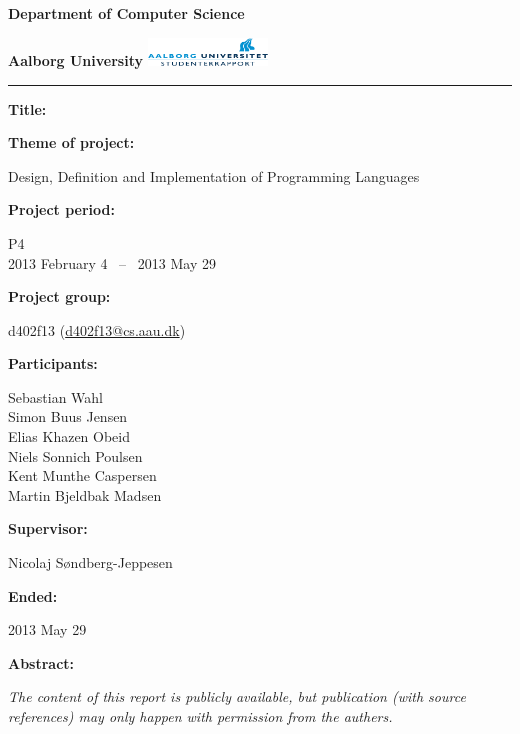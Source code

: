 \begin{nopagebreak}
\LARGE{\textbf{Department of Computer Science}}\vspace{-0.6cm}

\large{\textbf{Aalborg University}}
\hspace{5.70cm}\includegraphics[height=0.75cm]{pictures/aau_logo.pdf}


\hrule

\newcommand{\titleitem}[2]{\textbf{#1:}

\hspace*{0.5cm}
\begin{minipage}{0.9\columnwidth}#2\end{minipage}
\vspace{0.25cm}}
\begin{multicols}{2}

\titleitem{Title}{}

\titleitem{Theme of project}{Design, Definition and Implementation of Programming Languages}

\titleitem{Project period}{P4\\2013 February 4 ~--~ 2013 May 29}

\titleitem{Project group}{d402f13 (\url{d402f13@cs.aau.dk})}

\titleitem{Participants}{
    Sebastian Wahl\\
    Simon Buus Jensen\\
    Elias Khazen Obeid\\
    Niels Sonnich Poulsen\\
    Kent Munthe Caspersen\\
    Martin Bjeldbak Madsen
}

\titleitem{Supervisor}{Nicolaj Søndberg-Jeppesen}

\titleitem{Ended}{2013 May 29}

\vfill
\columnbreak

\titleitem{Abstract}{}

\end{multicols}
\centering
\textit{The content of this report is publicly available, but publication (with source references) may only happen with permission from the authers.}

\end{nopagebreak}
